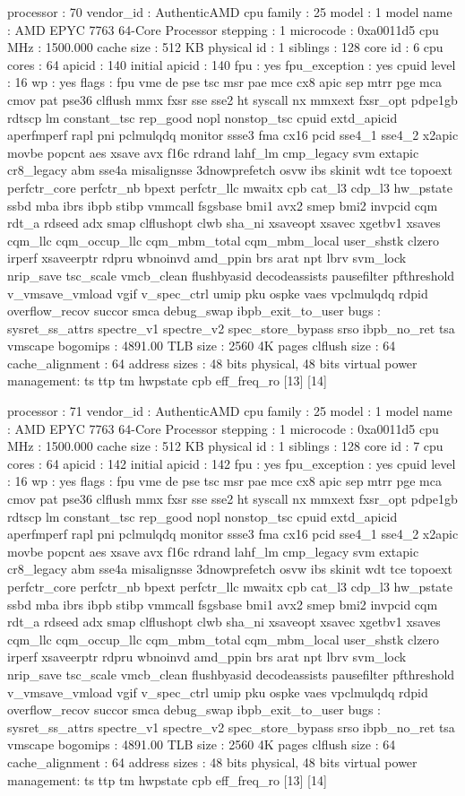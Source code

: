 processor	: 70
vendor_id	: AuthenticAMD
cpu family	: 25
model		: 1
model name	: AMD EPYC 7763 64-Core Processor
stepping	: 1
microcode	: 0xa0011d5
cpu MHz		: 1500.000
cache size	: 512 KB
physical id	: 1
siblings	: 128
core id		: 6
cpu cores	: 64
apicid		: 140
initial apicid	: 140
fpu		: yes
fpu_exception	: yes
cpuid level	: 16
wp		: yes
flags		: fpu vme de pse tsc msr pae mce cx8 apic sep mtrr pge mca cmov pat pse36 clflush mmx fxsr sse sse2 ht syscall nx mmxext fxsr_opt pdpe1gb rdtscp lm constant_tsc rep_good nopl nonstop_tsc cpuid extd_apicid aperfmperf rapl pni pclmulqdq monitor ssse3 fma cx16 pcid sse4_1 sse4_2 x2apic movbe popcnt aes xsave avx f16c rdrand lahf_lm cmp_legacy svm extapic cr8_legacy abm sse4a misalignsse 3dnowprefetch osvw ibs skinit wdt tce topoext perfctr_core perfctr_nb bpext perfctr_llc mwaitx cpb cat_l3 cdp_l3 hw_pstate ssbd mba ibrs ibpb stibp vmmcall fsgsbase bmi1 avx2 smep bmi2 invpcid cqm rdt_a rdseed adx smap clflushopt clwb sha_ni xsaveopt xsavec xgetbv1 xsaves cqm_llc cqm_occup_llc cqm_mbm_total cqm_mbm_local user_shstk clzero irperf xsaveerptr rdpru wbnoinvd amd_ppin brs arat npt lbrv svm_lock nrip_save tsc_scale vmcb_clean flushbyasid decodeassists pausefilter pfthreshold v_vmsave_vmload vgif v_spec_ctrl umip pku ospke vaes vpclmulqdq rdpid overflow_recov succor smca debug_swap ibpb_exit_to_user
bugs		: sysret_ss_attrs spectre_v1 spectre_v2 spec_store_bypass srso ibpb_no_ret tsa vmscape
bogomips	: 4891.00
TLB size	: 2560 4K pages
clflush size	: 64
cache_alignment	: 64
address sizes	: 48 bits physical, 48 bits virtual
power management: ts ttp tm hwpstate cpb eff_freq_ro [13] [14]

processor	: 71
vendor_id	: AuthenticAMD
cpu family	: 25
model		: 1
model name	: AMD EPYC 7763 64-Core Processor
stepping	: 1
microcode	: 0xa0011d5
cpu MHz		: 1500.000
cache size	: 512 KB
physical id	: 1
siblings	: 128
core id		: 7
cpu cores	: 64
apicid		: 142
initial apicid	: 142
fpu		: yes
fpu_exception	: yes
cpuid level	: 16
wp		: yes
flags		: fpu vme de pse tsc msr pae mce cx8 apic sep mtrr pge mca cmov pat pse36 clflush mmx fxsr sse sse2 ht syscall nx mmxext fxsr_opt pdpe1gb rdtscp lm constant_tsc rep_good nopl nonstop_tsc cpuid extd_apicid aperfmperf rapl pni pclmulqdq monitor ssse3 fma cx16 pcid sse4_1 sse4_2 x2apic movbe popcnt aes xsave avx f16c rdrand lahf_lm cmp_legacy svm extapic cr8_legacy abm sse4a misalignsse 3dnowprefetch osvw ibs skinit wdt tce topoext perfctr_core perfctr_nb bpext perfctr_llc mwaitx cpb cat_l3 cdp_l3 hw_pstate ssbd mba ibrs ibpb stibp vmmcall fsgsbase bmi1 avx2 smep bmi2 invpcid cqm rdt_a rdseed adx smap clflushopt clwb sha_ni xsaveopt xsavec xgetbv1 xsaves cqm_llc cqm_occup_llc cqm_mbm_total cqm_mbm_local user_shstk clzero irperf xsaveerptr rdpru wbnoinvd amd_ppin brs arat npt lbrv svm_lock nrip_save tsc_scale vmcb_clean flushbyasid decodeassists pausefilter pfthreshold v_vmsave_vmload vgif v_spec_ctrl umip pku ospke vaes vpclmulqdq rdpid overflow_recov succor smca debug_swap ibpb_exit_to_user
bugs		: sysret_ss_attrs spectre_v1 spectre_v2 spec_store_bypass srso ibpb_no_ret tsa vmscape
bogomips	: 4891.00
TLB size	: 2560 4K pages
clflush size	: 64
cache_alignment	: 64
address sizes	: 48 bits physical, 48 bits virtual
power management: ts ttp tm hwpstate cpb eff_freq_ro [13] [14]

